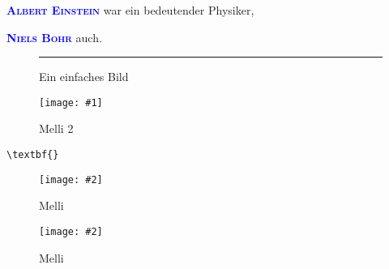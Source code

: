 \documentclass[12pt,ngerman]{scrartcl}
\newcommand{\bild}{%
\textcolor{lime}{\rule{8cm}{6cm}}}
\newcommand{\latexbefehl}[1]{\texttt{\textbackslash #1}}
\newcommand{\person}[1]{\textcolor{red}{\textsc{\bfseries #1}}}
\renewcommand{\person}[1]{\textcolor{blue}{\textsc{\bfseries #1}}}
\newcommand{\image}[2]{%
\begin{figure}
\centering
\texttt{[image: \#1]}
\caption{#2}\label{fig:#1}
\end{figure}
}
\newcommand{\imagew}[3][1.0]{%
\begin{figure}
\centering
\texttt{[image: \#2]}
\caption{#3}\label{fig:#2}
\end{figure}
}
\begin{document}
\person{Albert Einstein} war ein bedeutender Physiker,

\person{Niels Bohr} auch.

\begin{figure}
\centering
\bild
\caption{Ein einfaches Bild}
\end{figure}

\image{./bilder/Katze}{Melli 2}

\pageref{fig:Katze}

\latexbefehl{textbf\{\}}

\imagew[0.5]{Katze}{Melli}

\imagew{Katze}{Melli}
\end{document}
